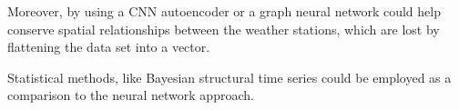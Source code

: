 \documentclass[11pt,table]{article}
\begin{document}
Moreover, by using a \ac{CNN} autoencoder or a graph neural network could help conserve spatial relationships between the weather stations, which are lost by flattening the data set into a vector.

Statistical methods, like Bayesian structural time series \cite{scott_predicting_2014,TFProb_Structural_Timeseries} could be employed as a comparison to the neural network approach.

\printbibliography
\end{document}
